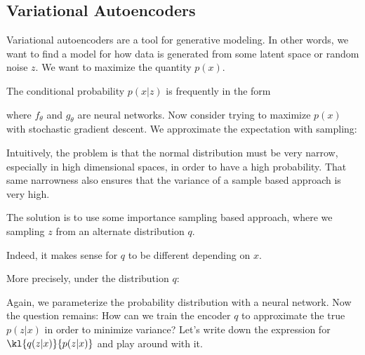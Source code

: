 \documentclass[12pt]{article}
\begin{document}
\subsection{Variational Autoencoders}

Variational autoencoders are a tool for generative modeling. In other words, we want to find a model for how data is generated from some latent space or random noise $z$. We want to maximize the quantity $p(x)$.


The conditional probability $p(x|z)$ is frequently in the form


where $f_\theta$ and $g_\theta$ are neural networks. Now consider trying to maximize $p(x)$ with stochastic gradient descent. We approximate the expectation with sampling:


Intuitively, the problem is that the normal distribution must be very narrow, especially in high dimensional spaces, in order to have a high probability. That same narrowness also ensures that the variance of a sample based approach is very high.

The solution is to use some importance sampling based approach, where we sampling $z$ from an alternate distribution $q$. 


Indeed, it makes sense for $q$ to be different depending on $x$. 


More precisely, under the distribution $q$:


Again, we parameterize the probability distribution with a neural network. Now the question remains: How can we train the encoder $q$ to approximate the true $p(z|x)$ in order to minimize variance? Let's write down the expression for $\kl{q(z|x)}{p(z|x)}$ and play around with it.

\end{document}

